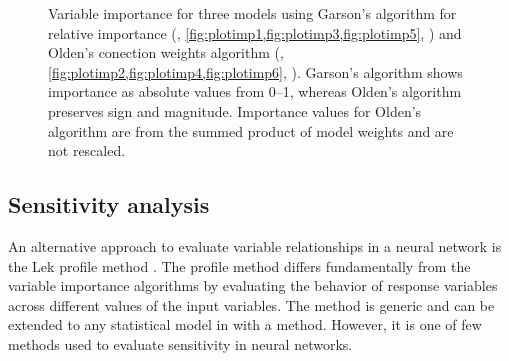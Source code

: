 \documentclass[article,shortnames]{jss}
\begin{document}
\begin{figure}[!h]
\caption{Variable importance for three models using Garson's algorithm for relative importance (, \cref{fig:plotimp1,fig:plotimp3,fig:plotimp5}, \citealt{Garson91,Goh95}) and Olden's conection weights algorithm (, \cref{fig:plotimp2,fig:plotimp4,fig:plotimp6}, \citealt{Olden04}).  Garson's algorithm shows importance as absolute values from 0--1, whereas Olden's algorithm preserves sign and magnitude.  Importance values for Olden's algorithm are from the summed product of model weights and are not rescaled.}
\label{fig:plotimp}
\end{figure}

\subsection{Sensitivity analysis}

An alternative approach to evaluate variable relationships in a neural network is the Lek profile method \citep{Lek96,Gevrey03}. The profile method differs fundamentally from the variable importance algorithms by evaluating the behavior of response variables across different values of the input variables. The method is generic and can be extended to any statistical model in  with a  method. However, it is one of few methods used to evaluate sensitivity in neural networks.  
\end{document}
